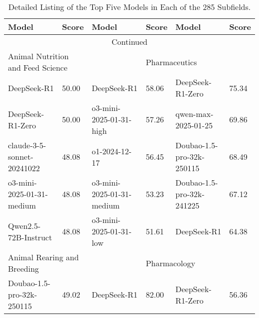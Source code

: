 {
\setlength{\tabcolsep}{2pt}  
\footnotesize
\begin{longtable}{p{4.2cm}>{\centering\arraybackslash} p{0.8cm}|p{4.2cm} >{\centering\arraybackslash} p{0.8cm}|p{4.2cm} >{\centering\arraybackslash} p{0.8cm}}
\caption{Detailed Listing of the Top Five Models in Each of the 285 Subfields.}
\label{table:label} \\ 
\hline
\textbf{Model} & \textbf{Score} & \textbf{Model} & \textbf{Score} & \textbf{Model} & \textbf{Score}\\
\hline
\endfirsthead


\multicolumn{6}{c}{Continued}\\
\endhead
\multicolumn{2}{p{5.15cm}|}{\cellcolor{teal!10} \centering Animal Nutrition and Feed Science} & \multicolumn{2}{p{5.15cm}|}{\cellcolor{blue!10} \centering Applied Optics} & \multicolumn{2}{p{5.15cm}}{\cellcolor{yellow!10} \centering Pharmaceutics}\\
\hline
\cellcolor{teal!5} DeepSeek-R1 & \cellcolor{teal!2}50.00 & \cellcolor{blue!5} DeepSeek-R1 & \cellcolor{blue!2} 58.06 & \cellcolor{yellow!5} DeepSeek-R1-Zero & \cellcolor{yellow!2} 75.34\\
\cellcolor{teal!5} DeepSeek-R1-Zero & \cellcolor{teal!2}50.00 & \cellcolor{blue!5} o3-mini-2025-01-31-high & \cellcolor{blue!2} 57.26 & \cellcolor{yellow!5} qwen-max-2025-01-25 & \cellcolor{yellow!2} 69.86\\
\cellcolor{teal!5} claude-3-5-sonnet-20241022 & \cellcolor{teal!2}48.08 & \cellcolor{blue!5} o1-2024-12-17 & \cellcolor{blue!2} 56.45 & \cellcolor{yellow!5} Doubao-1.5-pro-32k-250115 & \cellcolor{yellow!2} 68.49\\
\cellcolor{teal!5} o3-mini-2025-01-31-medium & \cellcolor{teal!2}48.08 & \cellcolor{blue!5} o3-mini-2025-01-31-medium & \cellcolor{blue!2} 53.23 & \cellcolor{yellow!5} Doubao-1.5-pro-32k-241225 & \cellcolor{yellow!2} 67.12\\
\cellcolor{teal!5} Qwen2.5-72B-Instruct & \cellcolor{teal!2}48.08 & \cellcolor{blue!5} o3-mini-2025-01-31-low & \cellcolor{blue!2} 51.61 & \cellcolor{yellow!5} DeepSeek-R1 & \cellcolor{yellow!2} 64.38\\
\hline
\multicolumn{2}{p{5.15cm}|}{\cellcolor{teal!10} \centering Animal Rearing and Breeding} & \multicolumn{2}{p{5.15cm}|}{\cellcolor{blue!10} \centering Laser Technology} & \multicolumn{2}{p{5.15cm}}{\cellcolor{yellow!10} \centering Pharmacology}\\
\hline
\cellcolor{teal!5} Doubao-1.5-pro-32k-250115 & \cellcolor{teal!2}49.02 & \cellcolor{blue!5} DeepSeek-R1 & \cellcolor{blue!2} 82.00 & \cellcolor{yellow!5} DeepSeek-R1-Zero & \cellcolor{yellow!2} 56.36\\

\end{longtable}}
